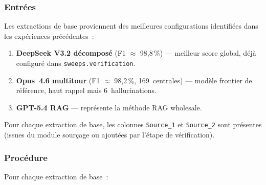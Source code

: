 \subsubsection{Entr\'ees}\label{sec:multi-verif-inputs}

Les extractions de base proviennent des meilleures configurations identifi\'ees
dans les exp\'eriences pr\'ec\'edentes~:

\begin{enumerate}
\item \textbf{DeepSeek V3.2 d\'ecompos\'e} (F1 $\approx$ 98,8\,\%) --- meilleur
  score global, d\'ej\`a configur\'e dans \texttt{sweeps.verification}.
\item \textbf{Opus~4.6 multitour} (F1 $\approx$ 98,2\,\%, 169~centrales) ---
  mod\`ele frontier de r\'ef\'erence, haut rappel mais 6~hallucinations.
\item \textbf{GPT-5.4 RAG} --- repr\'esente la m\'ethode RAG wholesale.
\end{enumerate}

\noindent Pour chaque extraction de base, les colonnes \texttt{Source\_1} et
\texttt{Source\_2} sont pr\'esentes (issues du module sourçage ou ajout\'ees par
l'\'etape de v\'erification).

\subsubsection{Proc\'edure}\label{sec:multi-verif-procedure}

Pour chaque extraction de base~:

